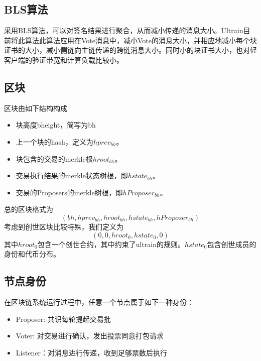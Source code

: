 \documentclass[12pt, UTF8]{article}
\begin{document}
\subsection{BLS算法}
采用BLS算法，可以对签名结果进行聚合，从而减小传递的消息大小。Ultrain目前将此算法此算法应用在Vote消息中，减小Vote的消息大小，并相应地减小每个块证书的大小，减小侧链向主链传递的跨链消息大小。同时小的块证书大小，也对轻客户端的验证带宽和计算负载比较小。

\subsection{区块}
区块由如下结构构成
\begin{itemize}
\item 块高度bheight，简写为bh
\item 上一个块的hash，定义为$hprev_{bh}$。
\item 块包含的交易的merkle根$hroot_{bh}$。
\item 交易执行结果的merkle状态树根，即$hstate_{bh}$。
\item 交易的Proposers的merkle树根，即$hProposer_{bh}$。
\end{itemize}

总的区块格式为
\begin{equation}
(bh, hprev_{bh}, hroot_{bh}, hstate_{bh}, hProposer_{bh})
\end{equation}
考虑到创世区块比较特殊，我们定义为
\begin{equation}
(0,0,hroot_0, hstate_0,0)
\end{equation}
其中$hroot_0$包含一个创世合约，其中约束了ultrain的规则。$hstate_0$包含创世成员的身份和代币分布。

\subsection{节点身份}
在区块链系统运行过程中，任意一个节点属于如下一种身份：
\begin{itemize}
\item Proposer: 共识每轮提起交易批
\item Voter: 对交易进行确认，发出投票同意打包请求
\item Listener：对消息进行传递，收到足够票数后执行
\end{itemize}
\end{document}
